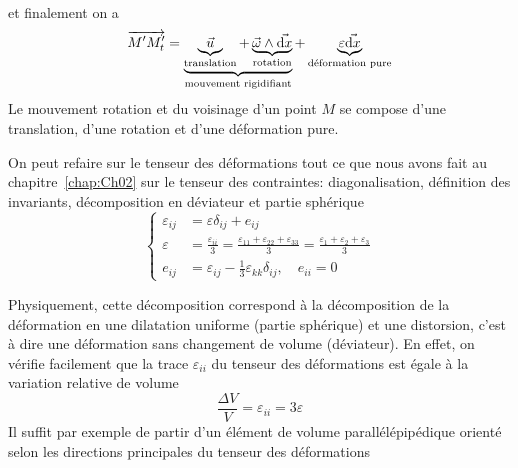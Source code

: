 et finalement on a
\begin{equation}
    \overrightarrow{M'M_t'} = \underbrace{\underbrace{\vec{u}}_{\text{translation}} + \underbrace{\vec{\omega} \wedge \vec{\mathrm{d} x}}_{\text{rotation}}}_{\text{mouvement rigidifiant}} + \underbrace{\mathbb{\varepsilon} \vec{\mathrm{d} x}}_{\text{déformation pure}}
     \label{eq:Ch03-037}
\end{equation}
Le mouvement rotation et du voisinage d'un point $M$ se  compose  d'une  translation, d'une rotation et d'une déformation pure.

On peut refaire sur le tenseur des déformations tout ce que nous avons fait au chapitre~\ref{chap:Ch02} sur le tenseur des contraintes: diagonalisation, définition des invariants, décomposition en déviateur et partie sphérique
\begin{equation}
    \left\{
    \begin{aligned}
        \varepsilon_{ij} &= \mathbb{\varepsilon} \delta_{ij} + e_{ij} \\
        \varepsilon & = \frac{\varepsilon_{ii}}{3} = \frac{\varepsilon_{11} + \varepsilon_{22} + \varepsilon_{33}}{3} = \frac{\varepsilon_1 + \varepsilon_2 + \varepsilon_3}{3} \\
        e_{ij} &= \varepsilon_{ij} - \frac{1}{3} \varepsilon_{kk} \delta_{ij}, \quad e_{ii} = 0
    \end{aligned}
    \right.
    \label{eq:Ch03-038}
\end{equation}

Physiquement, cette décomposition correspond à la décomposition de la déformation en une dilatation uniforme (partie sphérique) et une distorsion, c'est à dire une déformation sans changement de volume (déviateur).
En effet, on vérifie facilement que la trace $\varepsilon_{ii}$ du tenseur des déformations est égale à la variation relative de volume
\begin{equation}
    \frac{\Delta V}{V} = \varepsilon_{ii} = 3\varepsilon
    \label{eq:Ch03-039}
\end{equation}
Il suffit par exemple de partir d'un élément de volume parallélépipédique orienté selon les directions principales du tenseur des déformations

